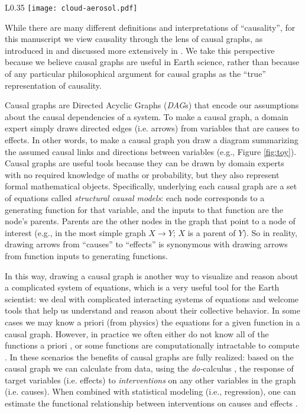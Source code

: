 \documentclass[12pt]{article}
\begin{document}
\begin{wrapfigure}{L}{0.35\textwidth}
  \texttt{[image: cloud-aerosol.pdf]}
  \caption{A toy graph example to demonstrate basic causal theory,
    involving cloud (C), aerosol (A), and surface solar radiation
    (S).}
  \label{fig:toy}
\end{wrapfigure}

While there are many different definitions and interpretations of
``causality'', for this manuscript we view causality through the lens
of causal graphs, as introduced in \citet{pearl1995causal} and
discussed more extensively in \citet{pearl2009causality}. We take this
perspective because we believe causal graphs are useful in Earth
science, rather than because of any particular philosophical argument
for causal graphs as the ``true'' representation of causality.

Causal graphs are Directed Acyclic Graphs (\emph{DAG}s) that encode
our assumptions about the causal dependencies of a system. To make a
causal graph, a domain expert simply draws directed edges
(i.e. arrows) from variables that are causes to effects. In other
words, to make a causal graph you draw a diagram summarizing the
assumed causal links and directions between variables (e.g., Figure
\ref{fig:toy}). Causal graphs are useful tools because they can be
drawn by domain experts with no required knowledge of maths or
probability, but they also represent formal mathematical
objects. Specifically, underlying each causal graph are a set of
equations called \emph{structural causal models}: each node
corresponds to a generating function for that variable, and the inputs
to that function are the node's parents. Parents are the other nodes
in the graph that point to a node of interest (e.g., in the most
simple graph $X \to Y$; $X$ is a parent of $Y$). So in reality,
drawing arrows from ``causes'' to ``effects'' is synonymous with
drawing arrows from function inputs to generating functions.

In this way, drawing a causal graph is another way to visualize and
reason about a complicated system of equations, which is a very useful
tool for the Earth scientist: we deal with complicated interacting
systems of equations and welcome tools that help us understand and
reason about their collective behavior. In some cases we may know a
priori (from physics) the equations for a given function in a causal
graph. However, in practice we often either do not know all of the
functions a priori \citep[e.g., plant stomata response to
VPD;][]{massmann2019, zhou2019arid, zhou2019feedback, grossiord2020},
or some functions are computationally intractable to compute
\citep[e.g., turbulence, moist convection, and cloud microphysics in
large scale models;][]{zadra2018,gentine2018}. In these scenarios the
benefits of causal graphs are fully realized: based on the causal
graph we can calculate from data, using the \textit{do-}calculus
\citep{pearl-1994-do-calculus}, the response of target variables
(i.e. effects) to \textit{interventions} on any other variables in the
graph (i.e. causes). When combined with statistical modeling (i.e.,
regression), one can estimate the functional relationship between
interventions on causes and effects
\citep{pearl2009,shalizi2013,shi2019adapting,mao2020generative}.
\end{document}
